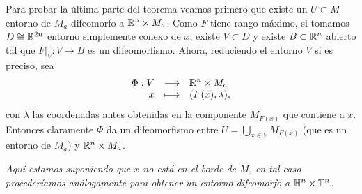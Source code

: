  Para probar la última parte del teorema veamos primero que existe un $U \subset M$ entorno de $M_a$ difeomorfo a $\mathbb{R}^n \times M_a$. 
 Como $F$ tiene rango máximo, si tomamos $D\cong\mathbb{R}^{2n}$ entorno simplemente conexo de $x$, existe $V\subset D$ y existe $B\subset \mathbb{R}^n$ abierto tal que $F|_V:V \rightarrow B$ es un difeomorfismo. Ahora, reduciendo el entorno $V$ si es preciso, sea
  \[
    \begin{array}{rcl}
      \Phi:V & \longrightarrow & \mathbb{R}^n \times M_a \\
           x & \longmapsto & (F(x), \lambda),
    \end{array}
  \]
  con $\lambda$ las coordenadas antes obtenidas en la componente $M_{F(x)}$ que contiene a $x$. Entonces claramente $\Phi$ da un difeomorfismo entre $U=\bigcup_{x\in V}M_{F(x)}$ (que es un entorno de $M_a$) y $\mathbb{R}^n \times M_a$.
\begin{obs}
  \em
  Aquí estamos suponiendo que $x$ no está en el borde de $M$, en tal caso procederíamos análogamente para obtener un entorno difeomorfo a $\mathbb{H}^n \times \mathbb{T}^n$.
\end{obs}








